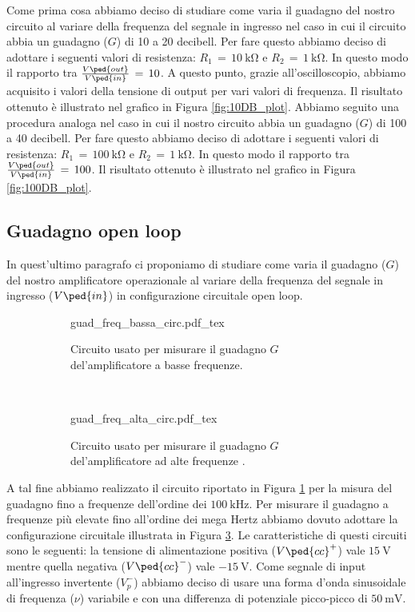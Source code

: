Come prima cosa abbiamo deciso di studiare come varia il guadagno del nostro circuito al variare della frequenza del segnale in ingresso nel caso in cui il circuito abbia un guadagno ($G$) di 10 a 20 decibell. Per fare questo abbiamo deciso di adottare i seguenti valori di resistenza: $R_1\,=\,\SI{10}{\kilo\ohm}$ e $R_2\,=\,\SI{1}{\kilo\ohm}$. In questo modo il rapporto tra $\frac{V\ped{out}}{V\ped{in}}\,=\,10$. A questo punto, grazie all'oscilloscopio, abbiamo acquisito i valori della tensione di output per vari valori di frequenza. Il risultato ottenuto è illustrato nel grafico in Figura \ref{fig:10DB_plot}.
Abbiamo seguito una procedura analoga nel caso in cui il nostro circuito abbia un guadagno ($G$) di 100 a 40 decibell. Per fare questo abbiamo deciso di adottare i seguenti valori di resistenza: $R_1\,=\,\SI{100}{\kilo\ohm}$ e $R_2\,=\,\SI{1}{\kilo\ohm}$. In questo modo il rapporto tra $\frac{V\ped{out}}{V\ped{in}}\,=\,100$. Il risultato ottenuto è illustrato nel grafico in Figura \ref{fig:100DB_plot}.

\subsection*{Guadagno open loop}

In quest'ultimo paragrafo ci proponiamo di studiare come varia il guadagno ($G$) del nostro amplificatore operazionale al variare della frequenza del segnale in ingresso ($V\ped{in}$) in configurazione circuitale open loop.

\begin{figure}[h]
        \centering
        \begin{subfigure}[b]{0.45\textwidth}
        		\def\svgwidth{\textwidth}
                {guad_freq_bassa_circ.pdf_tex}
                \caption{Circuito usato per misurare il guadagno $G$ del'amplificatore a basse frequenze.}
                \label{fig:G_open_loop_basso}
        \end{subfigure}
        ~
        \begin{subfigure}[b]{0.45\textwidth}
        		\def\svgwidth{\textwidth}
                {guad_freq_alta_circ.pdf_tex}
                \caption{Circuito usato per misurare il guadagno $G$ del'amplificatore ad alte frequenze .}
                \label{fig:G_open_loop_alto}
        \end{subfigure}
        \caption{}
\end{figure}

A tal fine abbiamo realizzato il circuito riportato in Figura \ref{fig:G_open_loop_basso} per la misura del guadagno fino a frequenze dell'ordine dei $\SI{100}{\kilo\hertz}$. Per misurare il guadagno a frequenze più elevate fino all'ordine dei mega Hertz abbiamo dovuto adottare la configurazione circuitale illustrata in Figura \ref{fig:G_open_loop_alto}. Le caratteristiche di questi circuiti sono le seguenti: la tensione di alimentazione positiva ($V\ped{cc}^+$) vale $\SI{+15}{\volt}$ mentre quella negativa ($V\ped{cc}^-$) vale $\SI{-15}{\volt}$. Come segnale di input all'ingresso invertente ($V_p^-$) abbiamo deciso di usare una forma d'onda sinusoidale di frequenza ($\nu$) variabile e con una differenza di potenziale picco-picco di $\SI{50}{\milli\volt}$.

